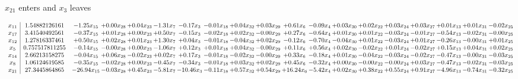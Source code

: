 \documentclass[9pt]{article}
\begin{document}
 $ x_{21} $ enters and $ x_{3} $ leaves 

 \[\begin{array}{c| c c@{\hskip 2pt} c@{\hskip 2pt} c@{\hskip 2pt} c@{\hskip 2pt} c@{\hskip 2pt} c@{\hskip 2pt} c@{\hskip 2pt} c@{\hskip 2pt} c@{\hskip 2pt} c@{\hskip 2pt} c@{\hskip 2pt} c@{\hskip 2pt} c@{\hskip 2pt} c@{\hskip 2pt} c@{\hskip 2pt} c@{\hskip 2pt} c@{\hskip 2pt} }
 x_{11}   &  1.54882126161 & -1.25 x_{15} & +  0.00 x_{28} & +  0.04 x_{23} & -1.31 x_{7} & -0.17 x_{3} & -0.01 x_{18} & +  0.04 x_{32} & +  0.03 x_{29} & +  0.61 x_{6} & -0.09 x_{4} & +  0.03 x_{30} & +  0.02 x_{22} & +  0.03 x_{24} & +  0.03 x_{27} & +  0.01 x_{13} & +  0.01 x_{31} & -0.02 x_{25}\\
 x_{17}   &  3.41540492561 & -0.37 x_{15} & +  0.01 x_{28} & +  0.00 x_{23} & +  0.50 x_{7} & -0.15 x_{3} & -0.02 x_{18} & +  0.02 x_{32} & -0.00 x_{29} & +  0.27 x_{6} & -0.64 x_{4} & +  0.01 x_{30} & +  0.01 x_{22} & -0.03 x_{24} & -0.01 x_{27} & -0.54 x_{13} & -0.02 x_{31} & -0.00 x_{25}\\
 x_{12}   &  1.27816337461 & +  0.50 x_{15} & +  0.02 x_{28} & +  0.01 x_{23} & +  1.30 x_{7} & +  0.04 x_{3} & -0.01 x_{18} & -0.04 x_{32} & +  0.02 x_{29} & -0.12 x_{6} & -0.70 x_{4} & -0.04 x_{30} & +  0.01 x_{22} & -0.03 x_{24} & +  0.01 x_{27} & -0.26 x_{13} & -0.00 x_{31} & +  0.01 x_{25}\\
 x_{5}   &  0.757517811255 & -0.14 x_{15} & -0.00 x_{28} & +  0.00 x_{23} & -1.06 x_{7} & +  0.12 x_{3} & +  0.01 x_{18} & +  0.04 x_{32} & -0.00 x_{29} & +  0.11 x_{6} & +  0.56 x_{4} & +  0.02 x_{30} & -0.02 x_{22} & +  0.01 x_{24} & -0.02 x_{27} & +  0.15 x_{13} & +  0.04 x_{31} & +  0.02 x_{25}\\
 x_{14}   &  2.66213158275 & -0.04 x_{15} & +  0.06 x_{28} & -0.02 x_{23} & +  0.02 x_{7} & +  0.17 x_{3} & -0.01 x_{18} & -0.02 x_{32} & -0.00 x_{29} & +  0.33 x_{6} & -0.18 x_{4} & +  0.01 x_{30} & -0.04 x_{22} & -0.03 x_{24} & -0.02 x_{27} & -0.47 x_{13} & -0.00 x_{31} & -0.03 x_{25}\\
 x_{8}   &  1.06124619585 & -0.35 x_{15} & -0.02 x_{28} & +  0.00 x_{23} & -0.45 x_{7} & -0.34 x_{3} & -0.01 x_{18} & +  0.03 x_{32} & +  0.02 x_{29} & +  0.45 x_{6} & -0.32 x_{4} & +  0.00 x_{30} & -0.00 x_{22} & -0.00 x_{24} & +  0.03 x_{27} & -0.47 x_{13} & -0.02 x_{31} & -0.03 x_{25}\\
 x_{21}   &  27.3445864865 & -26.94 x_{15} & -0.03 x_{28} & +  0.45 x_{23} & -5.81 x_{7} & -10.46 x_{3} & -0.11 x_{18} & +  0.57 x_{32} & +  0.54 x_{29} & + 16.24 x_{6} & -5.42 x_{4} & +  0.02 x_{30} & +  0.38 x_{22} & +  0.55 x_{24} & +  0.91 x_{27} & -4.96 x_{13} & -0.74 x_{31} & -0.32 x_{25}\\

\end{array}\]
\end{document}
